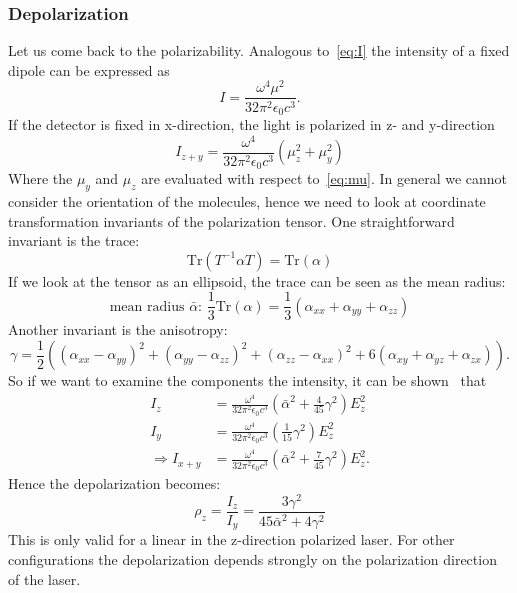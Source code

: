 \subsubsection{Depolarization}
\label{ssub:Depolarization}

Let us come back to the polarizability. Analogous to~\eqref{eq:I} the intensity of a fixed
dipole can be expressed as 
\begin{equation}
    I = \frac{\omega^4 \mu^2}{32\pi^2 \epsilon_0 c^3}.
\end{equation}
If the detector is fixed in x-direction, the light is polarized in z- and y-direction\cite{wiss}
\begin{equation}
    I_{z+y} = \frac{\omega^4}{32\pi^2 \epsilon_0 c^3}(\mu_z^2 + \mu_y^2)
\end{equation}
Where the $\mu_y$ and $\mu_z$ are evaluated with respect to~\eqref{eq:mu}. In general we cannot consider 
the orientation of the molecules, hence we need to look at coordinate transformation invariants of
the polarization tensor. One straightforward invariant is the trace: 
\begin{equation}
    \mathrm{Tr}( T^{-1}\alpha T) = \mathrm{Tr}(\alpha)
\end{equation}
If we look at the tensor as an ellipsoid, the trace can be seen as the mean radius: 
\begin{equation}
    \text{mean radius $\bar{\alpha}$: } \frac{1}{3}\mathrm{Tr}(\alpha) = \frac{1}{3}(\alpha_{xx} +\alpha_{yy}+ \alpha_{zz})
\end{equation}
Another invariant is
the anisotropy:
\begin{equation}
    \gamma = \frac{1}{2} \left( (\alpha_{xx} - \alpha_{yy})^2 + (\alpha_{yy} - \alpha_{zz})^2 + (\alpha_{zz} - \alpha_{xx})^2
        + 6(\alpha_{xy} + \alpha_{yz} + \alpha_{zx}) 
    \right).
\end{equation}
So if we want to examine the components the intensity, it can be shown~\cite{koningstein1972introduction} that 
\begin{align}
    I_{z} &= \frac{\omega^4}{32\pi^2 \epsilon_0 c^3} \left( \bar{\alpha}^2 + \frac{4}{45}\gamma^2 \right) E_z^2 \\
    I_{y} &= \frac{\omega^4}{32\pi^2 \epsilon_0 c^3} \left( \frac{1}{15}\gamma^2 \right) E_z^2 \\
\Rightarrow  I_{x+y} &= \frac{\omega^4}{32\pi^2 \epsilon_0 c^3} \left( \bar{\alpha}^2 + \frac{7}{45}\gamma^2 \right) E_z^2.
\end{align}
Hence the depolarization becomes:
\begin{equation}
    \rho_z =  \frac{I_z}{I_y} = \frac{3\gamma^2}{45\bar{\alpha}^2 + 4\gamma^2} 
\end{equation}
This is only valid for a linear in the z-direction polarized laser. For other configurations the 
depolarization depends strongly on the polarization direction of the laser.
